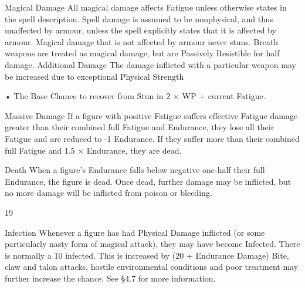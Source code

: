 \documentclass[a4paper]{article}
\begin{document}
\begin{multicols}{3}
Magical Damage
All magical damage affects Fatigue unless otherwise states in the spell description. Spell damage is
assumed to be nonphysical, and thus unaffected by
armour, unless the spell explicitly states that it is
affected by armour. Magical damage that is not
affected by armour never stuns. Breath weapons
are treated as magical damage, but are Passively
Resistible for half damage.
Additional Damage
The damage inflicted with a particular weapon may
be increased due to exceptional Physical Strength

• The Base Chance to recover from Stun in 2 × WP
+ current Fatigue.

Massive Damage
If a figure with positive Fatigue suffers effective
Fatigue damage greater than their combined full
Fatigue and Endurance, they lose all their Fatigue
and are reduced to -1 Endurance. If they suffer
more than their combined full Fatigue and 1.5 ×
Endurance, they are dead.

Death
When a figure’s Endurance falls below negative
one-half their full Endurance, the figure is dead.
Once dead, further damage may be inflicted, but no
more damage will be inflicted from poison or
bleeding.

19

Infection
Whenever a figure has had Physical Damage inflicted (or some particularly nasty form of magical
attack), they may have become Infected. There is
normally a 10%
infected. This is increased by (20 + Endurance
Damage)%
Bite, claw and talon attacks, hostile environmental
conditions and poor treatment may further increase
the chance. See §4.7 for more information.


\end{multicols}
\end{document}
